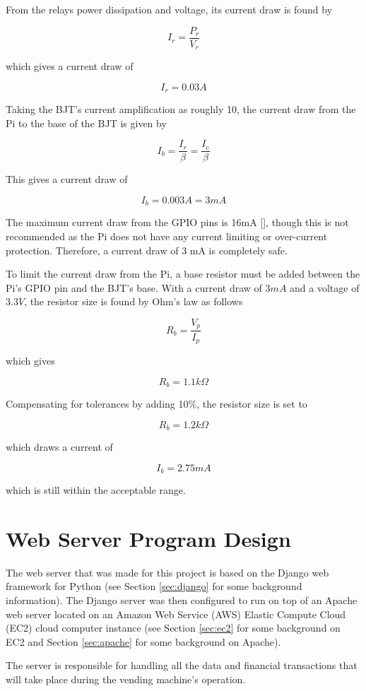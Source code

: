 From the relays power dissipation and voltage, its current draw is found by

\[
I_{r} = \frac{P_{r}}{V_{r}}
\]

which gives a current draw of

\[
I_{r} = 0.03A
\]

Taking the BJT's current amplification as roughly 10, the current draw from the Pi to the
base of the BJT is given by

\[
I_{b} = \frac{I_{r}}{\beta} = \frac{I_{c}}{\beta}
\]

This gives a current draw of

\[
I_{b} = 0.003A = 3mA
\]

The maximum current draw from the GPIO pins is 16mA [\cite{website:gpio-specs}], though this is
not recommended as the Pi does not have any current limiting or over-current protection.
Therefore, a current draw of 3 mA is completely safe.

To limit the current draw from the Pi, a base resistor must be added between the Pi's GPIO pin
and the BJT's base. With a current draw of $3mA$ and a voltage of $3.3V$, the resistor size is
found by Ohm's law as follows

\[
R_{b} = \frac{V_{p}}{I_{p}}
\]

which gives

\[
R_{b} = 1.1k\Omega
\]

Compensating for tolerances by adding 10\%, the resistor size is set to

\[R_{b} = 1.2k\Omega\]

which draws a current of 

\[I_{b} = 2.75 mA \]

which is still within the acceptable range.

\section{Web Server Program Design}

The web server that was made for this project is based on the Django web framework for Python
(see Section \ref{sec:django} for some background information). The Django server was then
configured to run on top of an Apache web server located on an Amazon Web Service (AWS) Elastic
Compute Cloud (EC2) cloud computer instance (see Section \ref{sec:ec2} for some background
on EC2 and Section \ref{sec:apache} for some background on Apache).

The server is responsible for handling all the data and financial transactions that will take
place during the vending machine's operation. 

